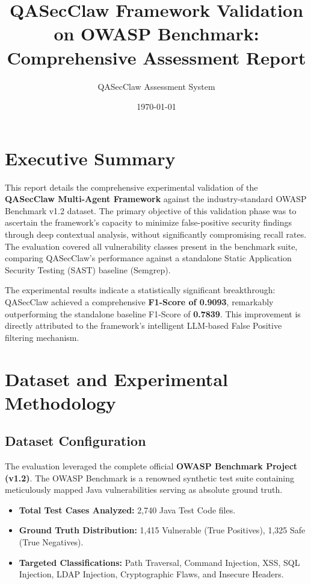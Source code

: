 \documentclass[11pt,a4paper]{article}
\title{\textbf{QASecClaw Framework Validation on OWASP Benchmark: Comprehensive Assessment Report}}
\author{QASecClaw Assessment System}
\date{\today}
\begin{document}
\maketitle

\section{Executive Summary}
This report details the comprehensive experimental validation of the \textbf{QASecClaw Multi-Agent Framework} against the industry-standard OWASP Benchmark v1.2 dataset. The primary objective of this validation phase was to ascertain the framework's capacity to minimize false-positive security findings through deep contextual analysis, without significantly compromising recall rates. The evaluation covered all vulnerability classes present in the benchmark suite, comparing QASecClaw's performance against a standalone Static Application Security Testing (SAST) baseline (Semgrep). 

The experimental results indicate a statistically significant breakthrough: QASecClaw achieved a comprehensive \textbf{F1-Score of 0.9093}, remarkably outperforming the standalone baseline F1-Score of \textbf{0.7839}. This improvement is directly attributed to the framework's intelligent LLM-based False Positive filtering mechanism.

\section{Dataset and Experimental Methodology}

\subsection{Dataset Configuration}
The evaluation leveraged the complete official \textbf{OWASP Benchmark Project (v1.2)}. The OWASP Benchmark is a renowned synthetic test suite containing meticulously mapped Java vulnerabilities serving as absolute ground truth.
\begin{itemize}
    \item \textbf{Total Test Cases Analyzed:} 2,740 Java Test Code files.
    \item \textbf{Ground Truth Distribution:} 1,415 Vulnerable (True Positives), 1,325 Safe (True Negatives).
    \item \textbf{Targeted Classifications:} Path Traversal, Command Injection, XSS, SQL Injection, LDAP Injection, Cryptographic Flaws, and Insecure Headers.
\end{itemize}
\end{document}
